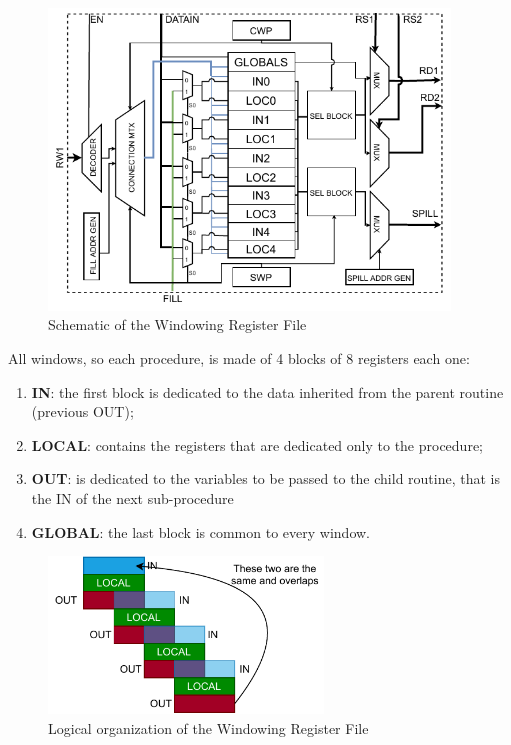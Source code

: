 \begin{figure}[H]
    \centering
    \includegraphics[width=0.95\textwidth]{chapters/4_DecodeStage/images/DLX_RF.pdf}
    \caption{Schematic of the Windowing Register File}
    \label{WRF}
\end{figure}

All windows, so each procedure, is made of 4 blocks of 8 registers each one:
\begin{enumerate}
	\itemsep0sp
	\item \textbf{IN}: the first block is dedicated to the data inherited from the parent routine (previous OUT);
	\item \textbf{LOCAL}: contains the registers that are dedicated only to the procedure;
	\item \textbf{OUT}: is dedicated to the variables to be passed to the child routine, that is the IN of the next sub-procedure
	\item \textbf{GLOBAL}: the last block is common to every window.
\end{enumerate}

\begin{figure}[H]
    \centering
    \includegraphics[width=0.65\textwidth]{chapters/4_DecodeStage/images/DLX_RF_BASICS.pdf}
    \caption{Logical organization of the Windowing Register File}
    \label{logical_wrf}
\end{figure}

